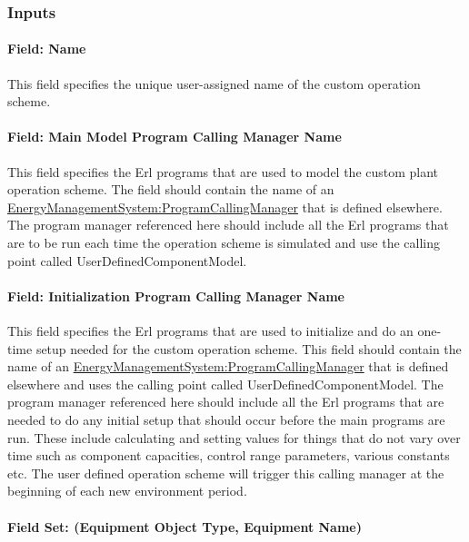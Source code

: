 \subsubsection{Inputs}\label{inputs-1-047}

\paragraph{Field: Name}\label{field-name-4-032}

This field specifies the unique user-assigned name of the custom operation scheme.

\paragraph{Field: Main Model Program Calling Manager Name}\label{field-main-model-program-calling-manager-name-1}

This field specifies the Erl programs that are used to model the custom plant operation scheme. The field should contain the name of an \hyperref[energymanagementsystemprogramcallingmanager]{EnergyManagementSystem:ProgramCallingManager} that is defined elsewhere. The program manager referenced here should include all the Erl programs that are to be run each time the operation scheme is simulated and use the calling point called UserDefinedComponentModel.

\paragraph{Field: Initialization Program Calling Manager Name}\label{field-initialization-program-calling-manager-name}

This field specifies the Erl programs that are used to initialize and do an one-time setup needed for the custom operation scheme. This field should contain the name of an \hyperref[energymanagementsystemprogramcallingmanager]{EnergyManagementSystem:ProgramCallingManager} that is defined elsewhere and uses the calling point called UserDefinedComponentModel. The program manager referenced here should include all the Erl programs that are needed to do any initial setup that should occur before the main programs are run. These include calculating and setting values for things that do not vary over time such as component capacities, control range parameters, various constants etc. The user defined operation scheme will trigger this calling manager at the beginning of each new environment period.

\paragraph{Field Set: (Equipment Object Type, Equipment Name)}\label{field-set-equipment-object-type-equipment-name}

